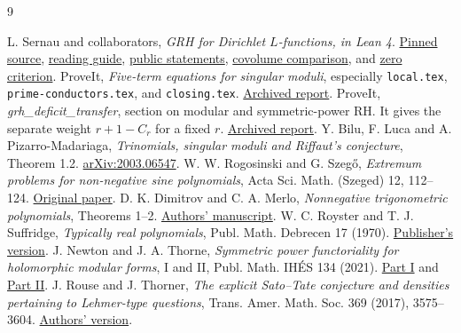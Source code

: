 \documentclass[11pt]{article}
\newcommand{\repo}{https://github.com/lsernau/grh-lean/blob/72fead102f663d5c7a407964a13dc0cf9d977207}
\begin{document}
\begin{thebibliography}{9}\small\raggedright
{} L. Sernau and collaborators, \emph{GRH for Dirichlet $L$-functions, in Lean 4}. \href{https://github.com/lsernau/grh-lean/tree/72fead102f663d5c7a407964a13dc0cf9d977207}{Pinned source}, \href{\repo/grh/GUIDE.md}{reading guide}, \href{\repo/grh/src/Statements.lean}{public statements}, \href{\repo/grh/src/New/Reduction/MainInequality.lean}{covolume comparison}, and \href{\repo/grh/src/New/Reduction/Zeros/Criterion.lean}{zero criterion}.
 ProveIt, \emph{Five-term equations for singular moduli}, especially \texttt{local.tex}, \texttt{prime-conductors.tex}, and \texttt{closing.tex}. \href{https://github.com/VladimirReshetnikov/ProveIt/blob/6fe2c1bd450aa7f19eab17fb9a6e76170b4fce00/docs/incoming/grh_sparse_singular_moduli.zip}{Archived report}.
 ProveIt, \emph{grh\_deficit\_transfer}, section on modular and symmetric-power RH. It gives the separate weight $r+1-C_r$ for a fixed $r$. \href{https://github.com/VladimirReshetnikov/ProveIt/blob/6fe2c1bd450aa7f19eab17fb9a6e76170b4fce00/docs/incoming/grh_deficit_transfer_2026-11-25.zip}{Archived report}.
 Y. Bilu, F. Luca and A. Pizarro-Madariaga, \emph{Trinomials, singular moduli and Riffaut's conjecture}, Theorem 1.2. \href{https://arxiv.org/abs/2003.06547}{arXiv:2003.06547}.
 W. W. Rogosinski and G. Szeg\H{o}, \emph{Extremum problems for non-negative sine polynomials}, Acta Sci. Math. (Szeged) 12, 112--124. \href{https://acta.bibl.u-szeged.hu/13628/1/math_012_pars_b_112-124.pdf}{Original paper}.
 D. K. Dimitrov and C. A. Merlo, \emph{Nonnegative trigonometric polynomials}, Theorems 1--2. \href{https://www.dcce.ibilce.unesp.br/~dimitrov/papers/ptpcapdf.pdf}{Authors' manuscript}.
 W. C. Royster and T. J. Suffridge, \emph{Typically real polynomials}, Publ. Math. Debrecen 17 (1970). \href{https://doi.org/10.5486/PMD.1970.17.1-4.35}{Publisher's version}.
 J. Newton and J. A. Thorne, \emph{Symmetric power functoriality for holomorphic modular forms}, I and II, Publ. Math. IH\'ES 134 (2021). \href{https://doi.org/10.1007/s10240-021-00127-3}{Part I} and \href{https://doi.org/10.1007/s10240-021-00126-4}{Part II}.
 J. Rouse and J. Thorner, \emph{The explicit Sato--Tate conjecture and densities pertaining to Lehmer-type questions}, Trans. Amer. Math. Soc. 369 (2017), 3575--3604. \href{https://arxiv.org/abs/1305.5283}{Authors' version}.
\end{thebibliography}
\end{document}
